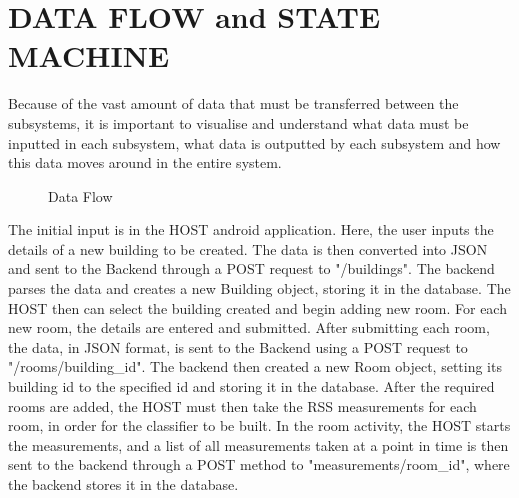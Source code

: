 \section{DATA FLOW and STATE MACHINE}
Because of the vast amount of data that must be transferred between the subsystems, it is important to visualise and understand what data must be inputted in each subsystem, what data is outputted by each subsystem and how this data moves around in the entire system.
\begin{figure}
\noindent{}
\caption{Data Flow}
\end{figure}
The initial input is in the HOST android application. Here, the user inputs the details of a new building to be created. The data is then converted into JSON and sent to the Backend through a POST request to "/buildings". The backend parses the data and creates a new Building object, storing it in the database. The HOST then can select the building created and begin adding new room. For each new room, the details are entered and submitted. After submitting each room, the data, in JSON format, is sent to the Backend using a POST request to "/rooms/building\_id". The backend then created a new Room object, setting its building id to the specified id and storing it in the database. After the required rooms are added, the HOST must then take the RSS measurements for each room, in order for the classifier to be built. In the room activity, the HOST starts the measurements, and a list of all measurements taken at a point in time is then sent to the backend through a POST method to "measurements/room\_id", where the backend stores it in the database.
